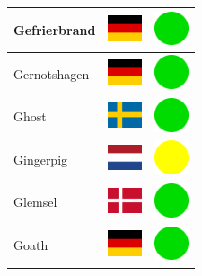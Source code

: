 \documentclass[12pt, a4paper, twoside]{report}
\begin{document}
\begin{center}
\begin{longtable}{|p{5cm}|p{2cm}|p{2cm}|}
 Gefrierbrand                                               & \includegraphics[width=1cm]{../4x3/de} &   \includegraphics[width=1cm]{../likes/y} \\ \hline
 Gernotshagen                                               & \includegraphics[width=1cm]{../4x3/de} &   \includegraphics[width=1cm]{../likes/y} \\ \hline
 Ghost                                                      & \includegraphics[width=1cm]{../4x3/se} &   \includegraphics[width=1cm]{../likes/y} \\ \hline
 Gingerpig                                                  & \includegraphics[width=1cm]{../4x3/nl} &   \includegraphics[width=1cm]{../likes/m} \\ \hline
 Glemsel                                                    & \includegraphics[width=1cm]{../4x3/dk} &   \includegraphics[width=1cm]{../likes/y} \\ \hline
 Goath                                                      & \includegraphics[width=1cm]{../4x3/de} &   \includegraphics[width=1cm]{../likes/y} \\ \hline

\end{longtable}
\end{center}
\end{document}
